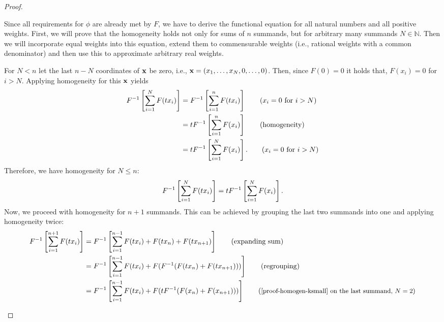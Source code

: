 \begin{proof}
\begin{proofpart}
		Since all requirements for $\phi$ are already met by $F$, we have to derive the functional equation for all natural numbers and all positive weights. First, we will prove that the homogeneity holds not only for sums of $n$ summands, but for arbitrary many summands $N \in \mathbb{N}$. Then we will incorporate equal weights into this equation, extend them to commensurable weights (i.e., rational weights with a common denominator) and then use this to approximate arbitrary real weights.

		\begin{proofpp}
			For $N < n$ let the last $n-N$ coordinates of $\mathbf{x}$ be zero, i.e., $\mathbf{x} = (x_1, \dots, x_N, 0, \dots , 0)$. Then, since $F(0) = 0$ it holds that, $F(x_i) = 0$ for $i > N$. Applying homogeneity for this $\mathbf{x}$ yields
			\begin{align}
				F^{-1} \left[ \sum_{i=1}^{N} F(t x_i) \right] & = F^{-1} \left[ \sum_{i=1}^{n} F(t x_i) \right] \tag{$x_i = 0$ for $i > N$}  \\
				                                                & = t F^{-1} \left[ \sum_{i=1}^{n} F(x_i) \right] \tag{homogeneity}            \\
				                                                & = t F^{-1} \left[ \sum_{i=1}^{N} F(x_i) \right]. \tag{$x_i = 0$ for $i > N$}
			\end{align}
			Therefore, we have homogeneity for $N \leq n$:
			\begin{equation} \label{proof-homogen-ksmall}
				F^{-1} \left[ \sum_{i=1}^{N} F(t x_i) \right] = t F^{-1} \left[ \sum_{i=1}^{N} F(x_i) \right].
			\end{equation}
			Now, we proceed with homogeneity for $n+1$ summands. This can be achieved by grouping the last two summands into one and applying homogeneity twice:
			{\allowdisplaybreaks[1] %
			\begin{align*}
				F^{-1} \left[ \sum_{i=1}^{n+1} F(t\ta_i) \right] & = F^{-1} \left[ \sum_{i=1}^{n-1} F(t\ta_i) + F(t\ta_{n}) + F(t\ta_{n+1}) \right]      \tag{expanding sum}                                                             \\
				                                                 & = F^{-1} \left[ \sum_{i=1}^{n-1} F(t\ta_i) + F (F^{-1} ( F(t\ta_{n}) + F(t\ta_{n+1}) )) \right] \tag{regrouping}                                                      \\
				                                                 & =  F^{-1} \left[ \sum_{i=1}^{n-1} F(t\ta_i) + F (t F^{-1} ( F(\ta_{n}) + F(\ta_{n+1}) )) \right] \tag{\small{\cref{proof-homogen-ksmall} on the last summand, $N=2$}} \\

\end{align*}}
\end{proofpp}
\end{proofpart}
\end{proof}
